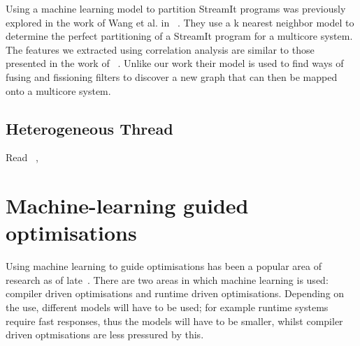 Using a machine learning model to partition StreamIt programs was previously explored in the work of Wang et al. in ~\cite{wang2013partitionstreamit}.
They use a k nearest neighbor model to determine the perfect partitioning of a StreamIt program for a multicore system. 
The features we extracted using correlation analysis are similar to those presented in the work of ~\cite{wang2013partitionstreamit}.
Unlike our work their model is used to find ways of fusing and fissioning filters to discover a new graph that can then be mapped onto a multicore system.

\subsection{Heterogeneous Thread}
Read ~\cite{becchi2006ThreadOnCore}, ~\cite{adileh2016power}


\section{Machine-learning guided optimisations}

Using machine learning to guide optimisations has been a popular area of research as of late~\cite{cummins2017pact,wang2018ml,dubach13dynamic}.
There are two areas in which machine learning is used: compiler driven optimisations and runtime driven optimisations.
Depending on the use, different models will have to be used; for example runtime systems require fast responses, thus the models will have to be smaller, whilst compiler driven optmisations are less pressured by this.
